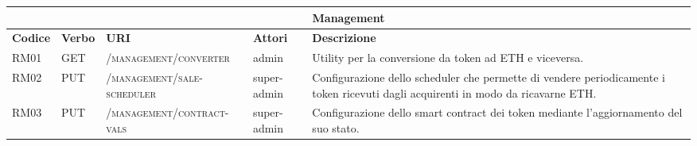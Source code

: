 \hspace*{-2cm}
\begin{tabular}{ |p{1.2cm}|p{1.5cm}|p{5cm}|p{2cm}|p{6cm}| }
    \hline
    \multicolumn{5}{|c|}{\textbf{Management}}\\
    \hline
    \hline
    \textbf{Codice} & \textbf{Verbo} & \textbf{URI} & \textbf{Attori} & \textbf{Descrizione}\\
    \hline
    RM01 & GET & \textsc{/management/converter} & admin & Utility per la conversione da token ad ETH e viceversa.\\
    \hline
    RM02 & PUT & \textsc{/management/sale-scheduler} & super-admin & Configurazione dello scheduler che permette di vendere periodicamente i token ricevuti dagli acquirenti in modo da ricavarne ETH.\\
    \hline
    RM03 & PUT & \textsc{/management/contract-vals} & super-admin & Configurazione dello smart contract dei token mediante l'aggiornamento del suo stato.\\
    \hline
\end{tabular}
